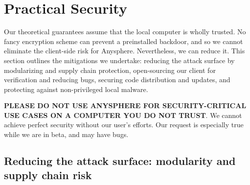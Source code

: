 \section{Practical Security} \label{sec:practical-security}

Our theoretical guarantees assume that the local computer is wholly trusted. No fancy encryption scheme can prevent a preinstalled backdoor, and so we cannot eliminate the client-side risk for Anysphere. Nevertheless, we can reduce it. This section outlines the mitigations we undertake: reducing the attack surface by modularizing and supply chain protection, open-sourcing our client for verification and reducing bugs, securing code distribution and updates, and protecting against non-privileged local malware.

\textbf{PLEASE DO NOT USE ANYSPHERE FOR SECURITY-CRITICAL USE CASES ON A COMPUTER YOU DO NOT TRUST}. We cannot achieve perfect security without our user's efforts. Our request is especially true while we are in beta, and may have bugs.




\subsection{Reducing the attack surface: modularity and supply chain risk}

